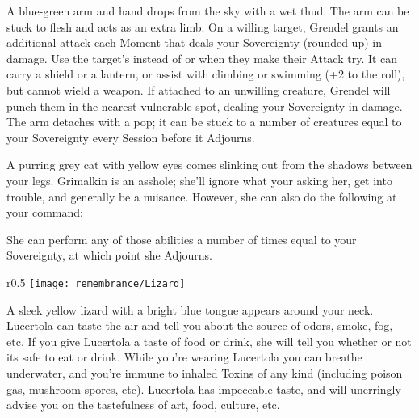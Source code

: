 
A blue-green arm and hand drops from the sky with a wet thud.  The arm can be stuck to flesh and acts as an extra limb.  On a willing target, Grendel grants an additional  attack each Moment that deals \OneHalf your Sovereignty (rounded up) in damage.  Use the target's \FOC instead of \VIG or \DEX when they make their Attack try.  It can carry a shield or a lantern, or assist with climbing or swimming (+2 to the roll), but cannot wield a weapon.  If attached to an unwilling creature, Grendel will punch them in the nearest vulnerable spot, dealing \OneHalf your Sovereignty in damage. The arm detaches with a pop; it can be stuck to a number of creatures equal to your Sovereignty every Session before it Adjourns.

\newpage


A purring grey cat with yellow eyes comes slinking out from the shadows between your legs.  Grimalkin is an asshole; she'll ignore what your asking her, get into trouble, and generally be a nuisance.  However, she can also do the following at your command:


She can perform any of those abilities a number of times equal to your Sovereignty, at which point she Adjourns.


\begin{wrapfigure}[15]{r}{0.5\textwidth}
    \texttt{[image: remembrance/Lizard]}
\end{wrapfigure}

A sleek yellow lizard with a bright blue tongue appears around your neck.  Lucertola can taste the air and tell you about the source of odors, smoke, fog, etc.  If you give Lucertola a taste of food or drink, she will tell you whether or not its safe to eat or drink.  While you're wearing Lucertola you can breathe underwater, and you're immune to inhaled Toxins of any kind (including poison gas, mushroom spores, etc). Lucertola has impeccable taste, and will unerringly advise you on the tastefulness of art, food, culture, etc.

